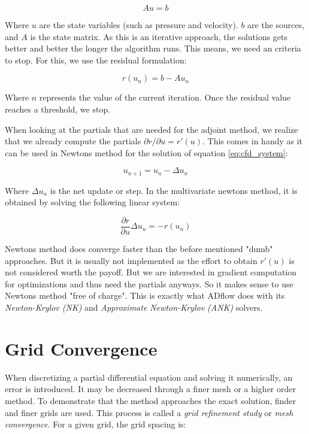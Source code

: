 \begin{equation}
    \label{eq:cfd_system}
    Au = b
\end{equation}

\noindent Where $u$ are the state variables (such as pressure and velocity). $b$
are the sources, and $A$ is the state matrix. As this is an iterative approach,
the solutions gets better and better the longer the algorithm runs. This means,
we need an criteria to stop. For this, we use the residual formulation:

\begin{equation}
    r(u_n) = b - Au_n 
\end{equation}
 
\noindent Where $n$ represents the value of the current iteration. Once the
residual value reaches a threshold, we stop.

When looking at the partials that are needed for the adjoint method, we realize
that we already compute the partials $\partial r / \partial u = r'(u)$. This
comes in handy as it can be used in Newtons method for the solution of equation
\ref{eq:cfd_system}:

\begin{equation}
    u_{n+1} = u_n - \Delta u_n
\end{equation}

\noindent Where $\Delta u_n$ is the net update or step. In the multivariate
newtons method, it is obtained by solving the following linear system:

\begin{equation}
    \frac{\partial r}{\partial u} \Delta u_n = - r(u_n)
\end{equation}

\noindent Newtons method does converge faster than the before mentioned "dumb"
approaches. But it is usually not implemented as the effort to obtain $r'(u)$
is not considered worth the payoff. But we are interested in gradient
computation for optimizations and thus need the partials anyways. So it makes
sense to use Newtons method "free of charge". This is exactly what ADflow does
with its \textit{Newton-Krylov (NK)} and \textit{Approximate Newton-Krylov
(ANK)} solvers. \cite{mdobook}








\section{Grid Convergence}
When discretizing a partial differential equation and solving it numerically,
an error is introduced. It may be decreased through a finer mesh or a higher
order method. To demonstrate that the method approaches the exact solution,
finder and finer grids are used. This process is called a \textit{grid
refinement study} or \textit{mesh convergence}. For a given grid, the grid
spacing is:

